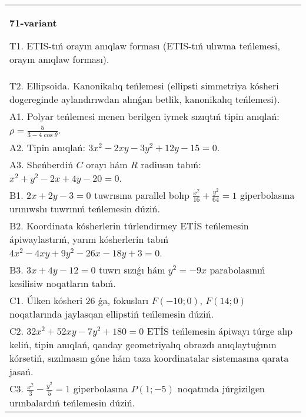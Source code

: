\documentclass{article}
\begin{document}
\begin{tabular}{m{17cm}}
\textbf{71-variant}
\newline

T1. ETIS-tıń orayın anıqlaw forması (ETIS-tıń ulıwma teńlemesi, orayın anıqlaw forması).\\

T2. Ellipsoida. Kanonikalıq teńlemesi (ellipsti simmetriya kósheri dogereginde aylandırıwdan alınǵan betlik, kanonikalıq teńlemesi).\\

A1. Polyar teńlemesi menen berilgen iymek sızıqtıń tipin anıqlań: $\rho=\frac{5}{3-4\cos\theta}$.\\

A2. Tipin anıqlań: $3 x^{2}-2 xy-3 y^{2}+12 y-15=0$.\\

A3. Sheńberdiń $C$ orayı hám $R$ radiusın tabıń: $x^2+y^2-2 x+4 y-20=0$.\\

B1. $2x + 2y - 3 = 0$ tuwrısına parallel bolıp $\frac{x^{2}}{16} + \frac{y^{2}}{64} = 1$ giperbolasına urınıwshı tuwrınıń teńlemesin dúziń.  \\

B2. Koordinata kósherlerin túrlendirmey ETİS teńlemesin ápiwaylastırıń, yarım kósherlerin tabıń $4x^{2} - 4xy + 9y^{2} - 26x - 18y + 3 = 0$.\\

B3. $3x + 4y - 12 = 0$ tuwrı sızıǵı hám $y^{2} = - 9x$ parabolasınıń kesilisiw noqatların tabıń.  \\

C1. Úlken kósheri 26 ǵa, fokusları $F( - 10;0)$, $F(14;0)$ noqatlarında jaylasqan ellipstiń teńlemesin dúziń.  \\

C2. $32x^{2} + 52xy - 7y^{2} + 180 = 0$ ETİS teńlemesin ápiwayı túrge alıp keliń, tipin anıqlań, qanday geometriyalıq obrazdı anıqlaytuǵının kórsetiń, sızılmasın góne hám taza koordinatalar sistemasına qarata jasań.  \\

C3. $\frac{x^{2}}{3} - \frac{y^{2}}{5} = 1$ giperbolasına $P(1; - 5)$ noqatında júrgizilgen urınbalardıń teńlemesin dúziń.\\

\end{tabular}
\vspace{1cm}
\end{document}
